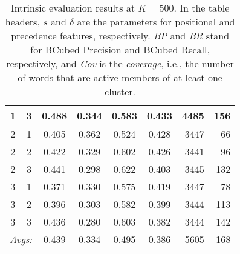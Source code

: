 {\begin{table}
{\begin{tabular}{cc|ccccrr}
1 & 3 & 0.488 & 0.344 & 0.583 & 0.433 & 4485 & 156 \\ \hline %
2 & 1 & 0.405 & 0.362 & 0.524 & 0.428 & 3447 & 66 \\%
2 & 2 & 0.422 & 0.329 & 0.602 & 0.426 & 3441 & 96 \\%
2 & 3 & 0.441 & 0.298 & 0.622 & 0.403 & 3445 & 132 \\ \hline %
3 & 1 & 0.371 & 0.330 & 0.575 & 0.419 & 3447 & 78 \\%
3 & 2 & 0.396 & 0.303 & 0.582 & 0.399 & 3444 & 113 \\%
3 & 3 & 0.436 & 0.280 & 0.603 & 0.382 & 3444 & 142 \\ \hline \hline %
 \multicolumn{2}{r|}{\textit{Avgs:}} & 0.439 & 0.334 & 0.495 & 0.386 & 5605 & 168 \\
\end{tabular}
}
\caption{Intrinsic evaluation results at $K = 500$. In the table headers, $s$ and $\delta$ are the parameters for positional and precedence features, respectively. \textit{BP} and \textit{BR} stand for BCubed Precision and BCubed Recall, respectively, and \textit{Cov} is the \textit{coverage}, i.e., the number of words that are active members of at least one cluster.}
\label{tab:intr-500}
\end{table}


}
